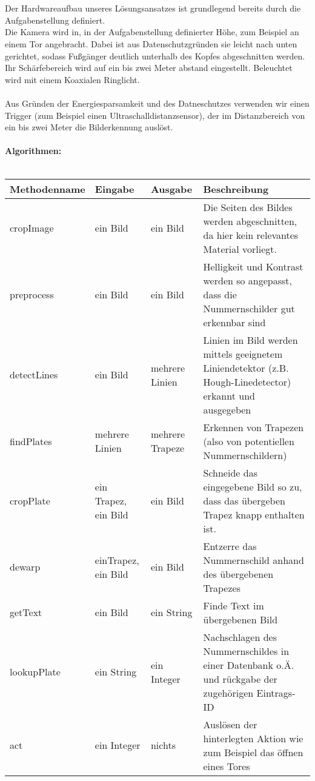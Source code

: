 \documentclass{../Vorlage/sebDenCls}
\begin{document}
\section{}
Der Hardwareaufbau unseres Lösungsansatzes ist grundlegend bereits durch die Aufgabenstellung definiert.\\
Die Kamera wird in, in der Aufgabenstellung definierter Höhe, zum Beispiel an einem Tor angebracht. Dabei ist aus Datenschutzgründen sie leicht nach unten gerichtet, sodass Fußgänger deutlich unterhalb des Kopfes abgeschnitten werden. Ihr Schärfebereich wird auf ein bis zwei Meter abstand eingestellt. Beleuchtet wird mit einem Koaxialen Ringlicht.\\
\\
Aus Gründen der Energiesparsamkeit und des Datneschutzes verwenden wir einen Trigger (zum Beispiel einen Ultraschalldistanzsensor), der im Distanzbereich von ein bis zwei Meter die Bilderkennung auslöst.\\
\\
\textbf{Algorithmen:}\\\\
\begin{longtable}{lllp{4cm}}
\textbf{Methodenname} & \textbf{Eingabe} & \textbf{Ausgabe} & \textbf{Beschreibung}\\
\hline
cropImage & ein Bild & ein Bild & Die Seiten des Bildes werden abgeschnitten, da hier kein relevantes Material vorliegt.\\\hline
preprocess & ein Bild & ein Bild & Helligkeit und Kontrast werden so angepasst, dass die Nummernschilder gut erkennbar sind\\\hline
detectLines & ein Bild & mehrere Linien & Linien im Bild werden mittels geeignetem Liniendetektor (z.B. Hough-Linedetector) erkannt und ausgegeben\\\hline
findPlates & mehrere Linien & mehrere Trapeze & Erkennen von Trapezen (also von potentiellen Nummernschildern)\\\hline
cropPlate & ein Trapez, ein Bild & ein Bild & Schneide das eingegebene Bild so zu, dass das übergeben Trapez knapp enthalten ist.\\\hline
dewarp & einTrapez, ein Bild & ein Bild & Entzerre das Nummernschild anhand des übergebenen Trapezes\\\hline
getText & ein Bild & ein String & Finde Text im übergebenen Bild\\\hline
lookupPlate & ein String & ein Integer & Nachschlagen des Nummernschildes in einer Datenbank o.Ä. und rückgabe der zugehörigen Eintrags-ID\\\hline
act & ein Integer & nichts & Auslösen der hinterlegten Aktion wie zum Beispiel das öffnen eines Tores\\

\end{longtable}
\end{document}
